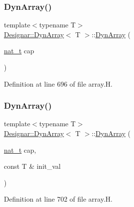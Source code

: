 \subsubsection{\texorpdfstring{Dyn\+Array()}{DynArray()}\hspace{0.1cm}{\footnotesize\ttfamily [1/6]}}
{\footnotesize\ttfamily template$<$typename T$>$ \\
\hyperlink{class_designar_1_1_dyn_array}{Designar\+::\+Dyn\+Array}$<$ T $>$\+::\hyperlink{class_designar_1_1_dyn_array}{Dyn\+Array} (\begin{DoxyParamCaption}\item[{\hyperlink{namespace_designar_aa72662848b9f4815e7bf31a7cf3e33d1}{nat\+\_\+t}}]{cap }\end{DoxyParamCaption})\hspace{0.3cm}{\ttfamily [inline]}}



Definition at line 696 of file array.\+H.

\mbox{\label{class_designar_1_1_dyn_array_afc29c646a101761f0e7a6fb8080b38fd}} 
\subsubsection{\texorpdfstring{Dyn\+Array()}{DynArray()}\hspace{0.1cm}{\footnotesize\ttfamily [2/6]}}
{\footnotesize\ttfamily template$<$typename T$>$ \\
\hyperlink{class_designar_1_1_dyn_array}{Designar\+::\+Dyn\+Array}$<$ T $>$\+::\hyperlink{class_designar_1_1_dyn_array}{Dyn\+Array} (\begin{DoxyParamCaption}\item[{\hyperlink{namespace_designar_aa72662848b9f4815e7bf31a7cf3e33d1}{nat\+\_\+t}}]{cap,  }\item[{const T \&}]{init\+\_\+val }\end{DoxyParamCaption})\hspace{0.3cm}{\ttfamily [inline]}}



Definition at line 702 of file array.\+H.

\mbox{\label{class_designar_1_1_dyn_array_ad51d585e1ee5f4fb0649e3e96392817b}} 
